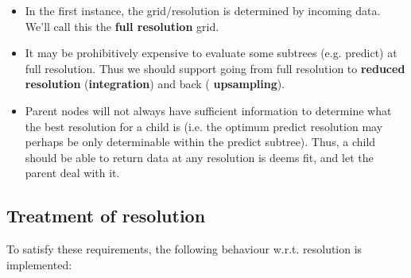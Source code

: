   \begin{itemize}
  
  \item In the first instance, the grid/resolution is determined by incoming
  data. We'll call this the {\bf full resolution} grid.

  \item It may be prohibitively expensive to evaluate some subtrees (e.g.
  predict) at full resolution. Thus we should support going from full
  resolution to {\bf reduced resolution} ({\bf integration}) and back ({\bf
  upsampling}). 

  \item Parent nodes will not always have sufficient information to determine
  what the best resolution for a child is (i.e. the optimum predict resolution
  may perhaps be only determinable within the predict subtree). Thus, a child
  should be able to  return data at any resolution is deems fit, and let the
  parent deal with it.

  \end{itemize}


\subsection{Treatment of resolution}
  
  To satisfy these requirements, the following behaviour w.r.t. resolution
  is implemented:
  
